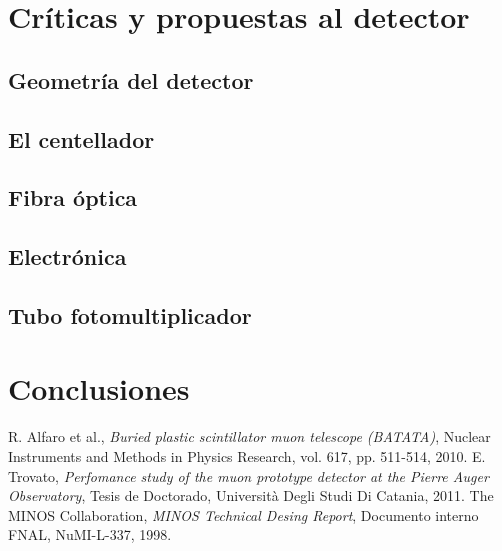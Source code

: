 \documentclass[a4paper,10pt]{article}
\numberwithin{equation}{section}
\begin{document}
\section{Críticas y propuestas al detector}

\subsection{Geometría del detector}

\subsection{El centellador}

\subsection{Fibra óptica}

\subsection{Electrónica}

\subsection{Tubo fotomultiplicador}

\section*{Conclusiones}

\begin{thebibliography}{10}
 R. Alfaro et al., \emph{Buried plastic scintillator muon telescope (BATATA)}, 
 Nuclear Instruments and Methods in Physics Research, vol. 617, pp. 511-514, 2010.
 E. Trovato, \emph{Perfomance study of the muon prototype detector at the Pierre 
 Auger Observatory}, Tesis de Doctorado, Università Degli Studi Di Catania, 2011.
 The MINOS Collaboration, \emph{MINOS Technical Desing Report}, Documento interno 
 FNAL, NuMI-L-337, 1998. 
\end{thebibliography}
\end{document}
